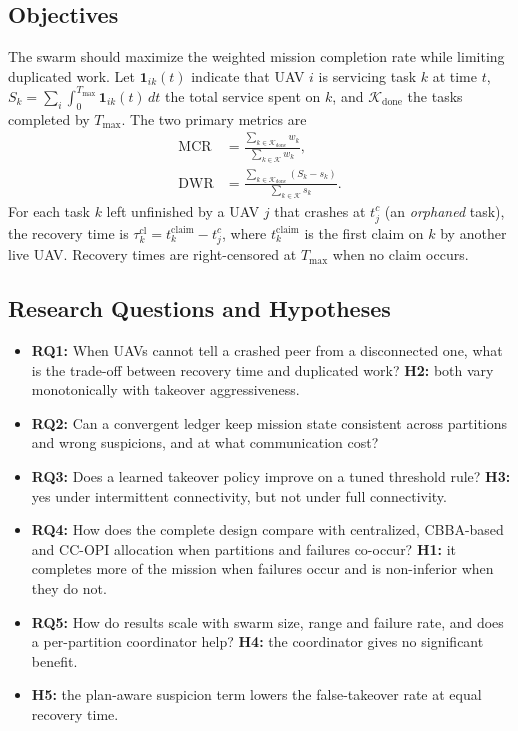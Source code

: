 \documentclass[journal]{IEEEtran}
\newcommand{\ind}{\mathbf{1}}
\begin{document}
\subsection{Objectives}
The swarm should maximize the weighted mission completion rate while limiting duplicated work. Let $\ind_{ik}(t)$ indicate that UAV $i$ is servicing task $k$ at time $t$, $S_k=\sum_i\int_0^{T_{\max}}\ind_{ik}(t)\,dt$ the total service spent on $k$, and $\mathcal{K}_{\mathrm{done}}$ the tasks completed by $T_{\max}$. The two primary metrics are
\begin{align}
\mathrm{MCR}&=\frac{\sum_{k\in\mathcal{K}_{\mathrm{done}}}w_k}{\sum_{k\in\mathcal{K}}w_k},\label{eq:mcr}\\
\mathrm{DWR}&=\frac{\sum_{k\in\mathcal{K}_{\mathrm{done}}}(S_k-s_k)}{\sum_{k\in\mathcal{K}}s_k}.\label{eq:dwr}
\end{align}
For each task $k$ left unfinished by a UAV $j$ that crashes at $t_j^c$ (an \emph{orphaned} task), the recovery time is $\tau_k^{\mathrm{cl}}=t_k^{\mathrm{claim}}-t_j^c$, where $t_k^{\mathrm{claim}}$ is the first claim on $k$ by another live UAV. Recovery times are right-censored at $T_{\max}$ when no claim occurs.

\subsection{Research Questions and Hypotheses}
\begin{itemize}
\item \textbf{RQ1:} When UAVs cannot tell a crashed peer from a disconnected one, what is the trade-off between recovery time and duplicated work? \textbf{H2:} both vary monotonically with takeover aggressiveness.
\item \textbf{RQ2:} Can a convergent ledger keep mission state consistent across partitions and wrong suspicions, and at what communication cost?
\item \textbf{RQ3:} Does a learned takeover policy improve on a tuned threshold rule? \textbf{H3:} yes under intermittent connectivity, but not under full connectivity.
\item \textbf{RQ4:} How does the complete design compare with centralized, CBBA-based and CC-OPI allocation when partitions and failures co-occur? \textbf{H1:} it completes more of the mission when failures occur and is non-inferior when they do not.
\item \textbf{RQ5:} How do results scale with swarm size, range and failure rate, and does a per-partition coordinator help? \textbf{H4:} the coordinator gives no significant benefit.
\item \textbf{H5:} the plan-aware suspicion term lowers the false-takeover rate at equal recovery time.
\end{itemize}
\end{document}
